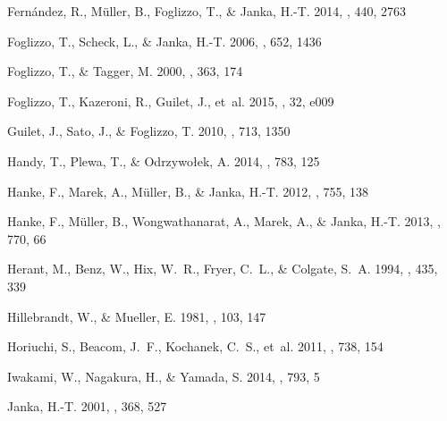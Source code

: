 \documentclass[twocolumn]{aastex6}
\begin{document}
\begin{thebibliography}{}
{Fern{\'a}ndez}, R., {M{\"u}ller}, B., {Foglizzo}, T., \& {Janka}, H.-T. 2014,
  \mnras, 440, 2763

{Foglizzo}, T., {Scheck}, L., \& {Janka}, H.-T. 2006, \apj, 652, 1436

{Foglizzo}, T., \& {Tagger}, M. 2000, \aap, 363, 174

{Foglizzo}, T., {Kazeroni}, R., {Guilet}, J., {et~al.} 2015, \pasa, 32, e009

{Guilet}, J., {Sato}, J., \& {Foglizzo}, T. 2010, \apj, 713, 1350

{Handy}, T., {Plewa}, T., \& {Odrzywo{\l}ek}, A. 2014, \apj, 783, 125

{Hanke}, F., {Marek}, A., {M{\"u}ller}, B., \& {Janka}, H.-T. 2012, \apj, 755,
  138

{Hanke}, F., {M{\"u}ller}, B., {Wongwathanarat}, A., {Marek}, A., \& {Janka},
  H.-T. 2013, \apj, 770, 66

{Herant}, M., {Benz}, W., {Hix}, W.~R., {Fryer}, C.~L., \& {Colgate}, S.~A.
  1994, \apj, 435, 339

{Hillebrandt}, W., \& {Mueller}, E. 1981, \aap, 103, 147

{Horiuchi}, S., {Beacom}, J.~F., {Kochanek}, C.~S., {et~al.} 2011, \apj, 738,
  154

{Iwakami}, W., {Nagakura}, H., \& {Yamada}, S. 2014, \apj, 793, 5

{Janka}, H.-T. 2001, \aap, 368, 527


\end{thebibliography}
\end{document}
